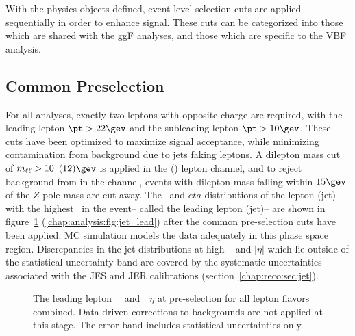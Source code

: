 
With the physics objects defined, event-level selection
cuts are applied sequentially in order to enhance signal. These cuts
can be categorized into those which are shared with the ggF analyses,
and those which are specific to the VBF analysis.

\subsection{Common Preselection}

For all \hwwlnln analyses, exactly two leptons with opposite charge
are required, with the leading lepton $\pt>22 \gev$ and the subleading lepton
$\pt>10 \gev$. These cuts have been optimized to maximize signal
acceptance, while minimizing contamination from background due to jets
faking leptons. A dilepton mass cut of
$m_{\ell\ell}> 10$ $(12) \gev$ is applied in the \emme (\eemm) lepton channel,
and to reject background from \ZDY in the \eemm channel, events with dilepton mass falling
within $15 \gev$ of the $Z$ pole mass are cut away. The \pt~and $eta$
distributions of the lepton (jet) with the highest \pt~in the event--
called the leading lepton (jet)-- are shown in
figure~\ref{chap:analysis:fig:lep_lead}
(\ref{chap:analysis:fig:jet_lead}) after the common pre-selection cuts
have been applied. MC simulation models the data
adequately in this phase space region. Discrepancies in the jet
distributions at high \pt~ and $|\eta|$ which lie outside of the statistical uncertainty band
are covered by the systematic uncertainties associated with the JES
and JER calibrations (section~\ref{chap:reco:sec:jet}). 

\begin{figure}[h]
\centering
{}
\caption{The leading lepton~
  \pt~and~~$\eta$ at
  pre-selection for all lepton flavors combined. Data-driven
  corrections to backgrounds are not applied at this stage. The error band
  includes statistical uncertainties only.}
\label{chap:analysis:fig:lep_lead}
\end{figure}



